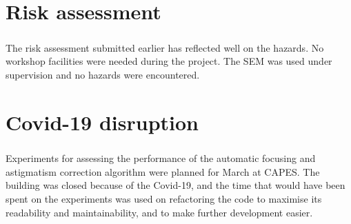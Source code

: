 \documentclass[12pt, twocolumn]{report}
\begin{document}
\appendix
\chapter{Risk assessment}
\paragraph{}
The risk assessment submitted earlier has reflected well on the hazards. No workshop facilities were needed during the project. The SEM was used under supervision and no hazards were encountered.

\chapter{Covid-19 disruption}
\paragraph{}
Experiments for assessing the performance of the automatic focusing and astigmatism correction algorithm were planned for March at CAPES. The building was closed because of the Covid-19, and the time that would have been spent on the experiments was used on refactoring the code to maximise its readability and maintainability, and to make further development easier.
\end{document}
